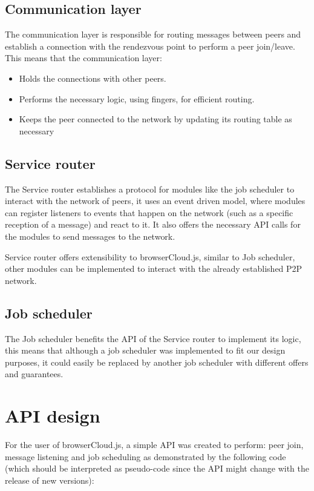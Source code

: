 \subsection{Communication layer}

The communication layer is responsible for routing messages between peers and establish a connection with the rendezvous point to perform a peer join/leave. This means that the communication layer:

\begin{itemize}
    \item Holds the connections with other peers.
    \item Performs the necessary logic, using fingers, for efficient routing.
    \item Keeps the peer connected to the network by updating its routing table as necessary
\end{itemize}

\subsection{Service router}

The Service router establishes a protocol for modules like the job scheduler to interact with the network of peers, it uses an event driven model, where modules can register listeners to events that happen on the network (such as a specific reception of a message) and react to it. It also offers the necessary API calls for the modules to send messages to the network.

Service router offers extensibility to browserCloud.js, similar to Job scheduler, other modules can be implemented to interact with the already established P2P network.

\subsection{Job scheduler}

The Job scheduler benefits the API of the Service router to implement its logic, this means that although a job scheduler was implemented to fit our design purposes, it could easily be replaced by another job scheduler with different offers and guarantees.

\section{API design}

For the user of browserCloud.js, a simple API was created to perform: peer join, message listening and job scheduling as demonstrated by the following code (which should be interpreted as pseudo-code since the API might change with the release of new versions):

